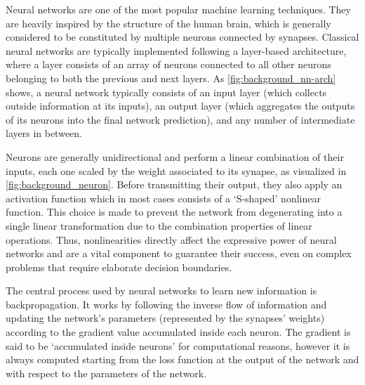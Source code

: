 Neural networks are one of the most popular machine learning techniques.
They are heavily inspired by the structure of the human brain, which is generally considered to be constituted by multiple neurons connected by synapses.
Classical neural networks are typically implemented following a layer-based architecture, where a layer consists of an array of neurons connected to all other neurons belonging to both the previous and next layers.
As \cref{fig:background_nn-arch} shows, a neural network typically consists of an input layer (which collects outside information at its inputs), an output layer (which aggregates the outputs of its neurons into the final network prediction), and any number of intermediate layers in between.

\begin{figure}[t!]
    \centering
    \quad
    \caption{}
    \label{fig:background_nn-arch_neuron}
\end{figure}

Neurons are generally unidirectional and perform a linear combination of their inputs, each one scaled by the weight associated to its synapse, as visualized in \cref{fig:background_neuron}.
Before transmitting their output, they also apply an activation function which in most cases consists of a `S-shaped' nonlinear function.
This choice is made to prevent the network from degenerating into a single linear transformation due to the combination properties of linear operations.
Thus, nonlinearities directly affect the expressive power of neural networks and are a vital component to guarantee their success, even on complex problems that require elaborate decision boundaries.

The central process used by neural networks to learn new information is backpropagation.
It works by following the inverse flow of information and updating the network's parameters (represented by the synapses' weights) according to the gradient value accumulated inside each neuron.
The gradient is said to be `accumulated inside neurons' for computational reasons, however it is always computed starting from the loss function at the output of the network and with respect to the parameters of the network.

